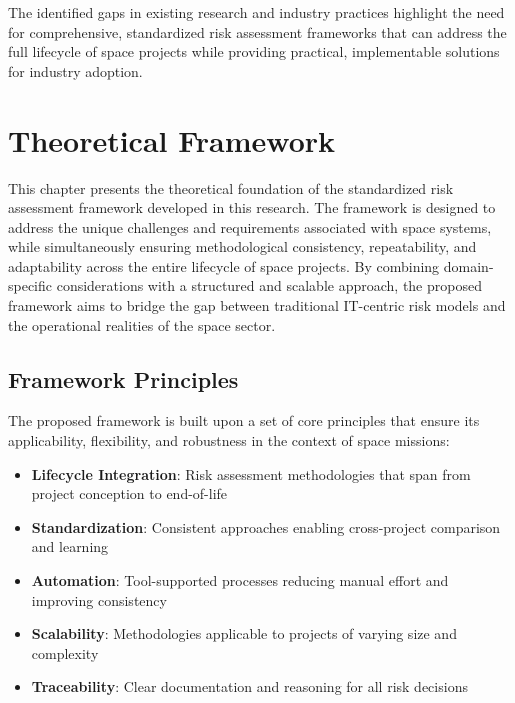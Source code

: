 \documentclass[binding=0.6cm]{sapthesis}
\begin{document}
The identified gaps in existing research and industry practices highlight the need for comprehensive, standardized risk assessment frameworks that can address the full lifecycle of space projects while providing practical, implementable solutions for industry adoption.

\chapter{Theoretical Framework}
\label{ch:framework}

This chapter presents the theoretical foundation of the standardized risk assessment framework developed in this research. The framework is designed to address the unique challenges and requirements associated with space systems, while simultaneously ensuring methodological consistency, repeatability, and adaptability across the entire lifecycle of space projects. By combining domain-specific considerations with a structured and scalable approach, the proposed framework aims to bridge the gap between traditional IT-centric risk models and the operational realities of the space sector.

\section{Framework Principles}

The proposed framework is built upon a set of core principles that ensure its applicability, flexibility, and robustness in the context of space missions:

\begin{itemize}
    \item \textbf{Lifecycle Integration}: Risk assessment methodologies that span from project conception to end-of-life
    \item \textbf{Standardization}: Consistent approaches enabling cross-project comparison and learning
    \item \textbf{Automation}: Tool-supported processes reducing manual effort and improving consistency
    \item \textbf{Scalability}: Methodologies applicable to projects of varying size and complexity
    \item \textbf{Traceability}: Clear documentation and reasoning for all risk decisions
\end{itemize}
\end{document}
